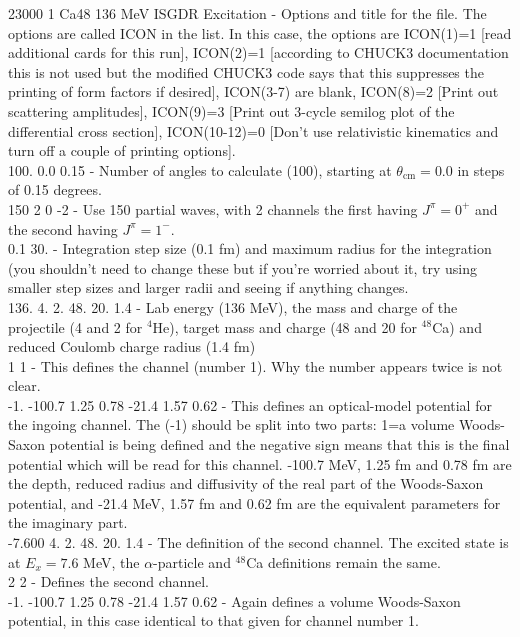 \documentclass[a4paper,10pt]{article}
\begin{document}
     23000     1    Ca48  136 MeV      ISGDR Excitation - Options and title for the file. The options are called ICON in the list. In this case, the options are ICON(1)=1 [read additional cards for this run], ICON(2)=1 [according to CHUCK3 documentation this is not used but the modified CHUCK3 code says that this suppresses the printing of form factors if desired], ICON(3-7) are blank, ICON(8)=2 [Print out scattering amplitudes], ICON(9)=3 [Print out 3-cycle semilog plot of the differential cross section], ICON(10-12)=0 [Don't use relativistic kinematics and turn off a couple of printing options]. \\
100.    0.0    0.15 - Number of angles to calculate (100), starting at $\theta_\mathrm{cm} = 0.0$ in steps of 0.15 degrees.\\
150  2  0 -2 - Use 150 partial waves, with 2 channels the first having $J^\pi = 0^+$ and the second having $J^\pi = 1^-$.\\
0.1     30. - Integration step size (0.1 fm) and maximum radius for the integration (you shouldn't need to change these but if you're worried about it, try using smaller step sizes and larger radii and seeing if anything changes.\\
136.    4.      2.      48.     20.     1.4 - Lab energy (136 MeV), the mass and charge of the projectile (4 and 2 for $^4$He), target mass and charge (48 and 20 for $^{48}$Ca) and reduced Coulomb charge radius (1.4 fm)\\
  1  1 - This defines the channel (number 1). Why the number appears twice is not clear.\\
-1.     -100.7  1.25    0.78            -21.4   1.57    0.62 - This defines an optical-model potential for the ingoing channel. The (-1) should be split into two parts: 1=a volume Woods-Saxon potential is being defined and the negative sign means that this is the final potential which will be read for this channel. -100.7 MeV, 1.25 fm and 0.78 fm are the depth, reduced radius and diffusivity of the real part of the Woods-Saxon potential, and -21.4 MeV, 1.57 fm and 0.62 fm are the equivalent parameters for the imaginary part.\\
-7.600  4.      2.      48.     20.     1.4 - The definition of the second channel. The excited state is at $E_x = 7.6$ MeV, the $\alpha$-particle and $^{48}$Ca definitions remain the same.\\
  2  2 - Defines the second channel.\\
-1.     -100.7  1.25    0.78            -21.4   1.57    0.62 - Again defines a volume Woods-Saxon potential, in this case identical to that given for channel number 1.\\
\end{document}
